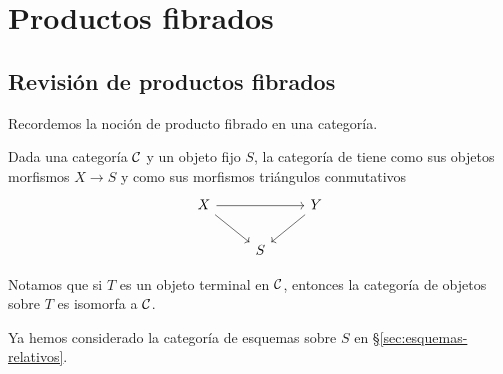 \documentclass{article}
\numberwithin{equation}{section}
\theoremstyle{definition}
\begin{document}

\pagebreak
\section{Productos fibrados}


\subsection{Revisión de productos fibrados}

Recordemos la noción de producto fibrado en una categoría.

\begin{definicion}
  Dada una categoría $\mathcal{C}$ y un objeto fijo $S$, la categoría
  de  tiene como sus objetos morfismos $X\to S$
  y como sus morfismos triángulos conmutativos
  \[ \begin{tikzcd}
      X \ar{rr}\ar{dr} && Y\ar{dl} \\
      & S
    \end{tikzcd} \]
\end{definicion}

Notamos que si $T$ es un objeto terminal en $\mathcal{C}$, entonces la categoría
de objetos sobre $T$ es isomorfa a $\mathcal{C}$.

\begin{ejemplo}
  Ya hemos considerado la categoría de esquemas sobre $S$
  en \S\ref{sec:esquemas-relativos}.
\end{ejemplo}
\end{document}

